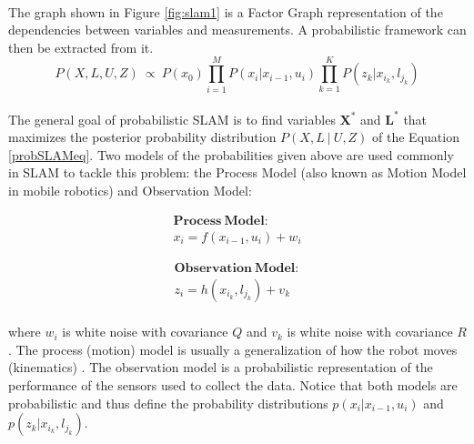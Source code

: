 \documentclass[12pt]{article}
\begin{document}
	\paragraph{}
	The graph shown in Figure \ref{fig:slam1} is a Factor Graph representation of the dependencies between variables and measurements. A probabilistic framework can then be extracted from it. 
	\begin{equation}
	P(X,L,U,Z)\ \propto \ P(x_0)\prod_{i=1}^{M}P(x_i|x_{i-1}, u_i)\prod_{k=1}^{K}P(z_k|x_{i_k},l_{j_k})
	\label{probSLAMeq}
	\end{equation}
	\paragraph{}
	The general goal of probabilistic SLAM is to find variables $\mathbf{X^*}$ and $\mathbf{L^*}$ that maximizes the posterior probability distribution $P(X,L\ |\ U, Z)$ of the Equation \ref{probSLAMeq}. Two models of the probabilities given above are used commonly in SLAM to tackle this problem: the Process Model (also known as Motion Model in mobile robotics) and Observation Model:
	
	\begin{minipage}{.48\linewidth}
		\centering
		\begin{equation*}
		\begin{split}
		\mathbf{Process\ Model:} \\ 
		x_i = f(x_{i-1}, u_i) + w_i
		\end{split}
		\end{equation*}
	\end{minipage}
	\begin{minipage}{.48\linewidth}
		\centering
		\begin{equation*}
		\begin{split}
		\mathbf{Observation\ Model:} \\ 
		z_i = h(x_{i_k}, l_{j_k}) + v_k
		\end{split}
		\end{equation*}
	\end{minipage}
	
	\paragraph{}
	where $w_i$ is white noise with covariance $Q$ and $v_k$ is white noise with covariance $R$. The process (motion) model is usually a generalization of how the robot moves (kinematics) \cite{Montemerlo02fastslam:a}\cite{772544}. The observation model is a probabilistic representation of the performance of the sensors used to collect the data. Notice that both models are probabilistic and thus define the probability distributions $p(x_i|x_{i-1},u_i)$ and $p(z_k|x_{i_k},l_{j_k})$.
\end{document}

